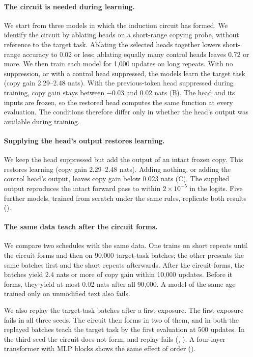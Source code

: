 \paragraph{The circuit is needed during learning.}
We start from three models in which the induction circuit has formed. We identify
the circuit by ablating heads on a short-range copying probe, without reference to
the target task. Ablating the selected heads together lowers short-range accuracy to
0.02 or less; ablating equally many control heads leaves 0.72 or more. We then train
each model for 1,000 updates on long repeats. With no suppression, or with a control
head suppressed, the models learn the target task (copy gain 2.29--2.48 nats). With
the previous-token head suppressed during training, copy gain stays between $-0.03$
and $0.02$ nats (B). The head and its inputs are frozen, so the
restored head computes the same function at every evaluation. The conditions
therefore differ only in whether the head's output was available during training.

\paragraph{Supplying the head's output restores learning.}
We keep the head suppressed but add the output of an intact frozen copy. This
restores learning (copy gain 2.29--2.48 nats). Adding nothing, or adding the control
head's output, leaves copy gain below 0.023 nats (C). The
supplied output reproduces the intact forward pass to within $2\times10^{-5}$ in the
logits. Five further models, trained from scratch under the same rules, replicate
both results ().

\paragraph{The same data teach after the circuit forms.}
We compare two schedules with the same data. One trains on short repeats until the
circuit forms and then on 90,000 target-task batches; the other presents the same
batches first and the short repeats afterwards. After the circuit forms, the batches
yield 2.4 nats or more of copy gain within 10,000 updates. Before it forms, they
yield at most 0.02 nats after all 90,000. A model of the same age trained only on
unmodified text also fails.

We also replay the target-task batches after a first exposure. The first exposure
fails in all three seeds. The circuit then forms in two of them, and in both the
replayed batches teach the target task by the first evaluation at 500 updates. In
the third seed the circuit does not form, and replay fails (,
). A four-layer transformer with MLP blocks shows the same effect
of order ().

